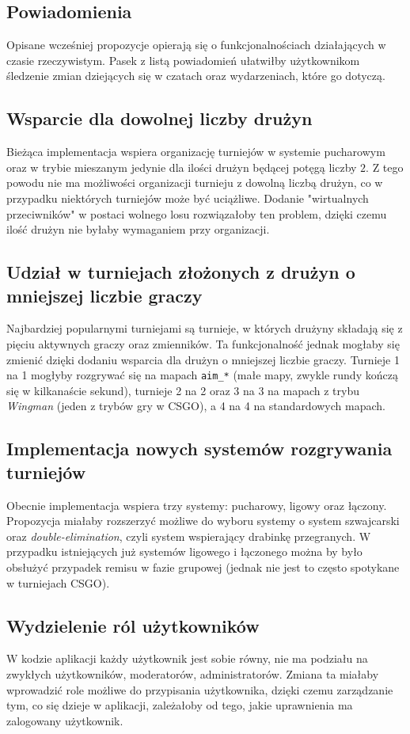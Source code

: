 \documentclass[shortabstract]{iithesis}
\theoremstyle{definition} \newtheorem{definition}{Definicja}[]
\theoremstyle{remark} \newtheorem{remark}[definition]{Observation}
\theoremstyle{plain} \newtheorem{theorem}[definition]{Theorem}
\theoremstyle{plain} \newtheorem{lemma}[definition]{Lemma}
\begin{document}
\subsection{Powiadomienia}
Opisane wcześniej propozycje opierają się o funkcjonalnościach działających w czasie rzeczywistym. Pasek z listą powiadomień ułatwiłby użytkownikom śledzenie zmian dziejących się w czatach oraz wydarzeniach, które go dotyczą.

\subsection{Wsparcie dla dowolnej liczby drużyn}
Bieżąca implementacja wspiera organizację turniejów w systemie pucharowym oraz w trybie mieszanym jedynie dla ilości drużyn będącej potęgą liczby $2$. Z tego powodu nie ma możliwości organizacji turnieju z dowolną liczbą drużyn, co w przypadku niektórych turniejów może być uciążliwe. Dodanie "wirtualnych przeciwników" w postaci wolnego losu rozwiązałoby ten problem, dzięki czemu ilość drużyn nie byłaby wymaganiem przy organizacji.

\subsection{Udział w turniejach złożonych z drużyn o mniejszej liczbie graczy}
Najbardziej popularnymi turniejami są turnieje, w których drużyny składają się z pięciu aktywnych graczy oraz zmienników. Ta funkcjonalność jednak mogłaby się zmienić dzięki dodaniu wsparcia dla drużyn o mniejszej liczbie graczy. Turnieje 1 na 1 mogłyby rozgrywać się na mapach \texttt{aim\_*} (małe mapy, zwykle rundy kończą się w kilkanaście sekund), turnieje 2 na 2 oraz 3 na 3 na mapach z trybu \textit{Wingman} (jeden z trybów gry w CSGO), a 4 na 4 na standardowych mapach.

\subsection{Implementacja nowych systemów rozgrywania turniejów}
Obecnie implementacja wspiera trzy systemy: pucharowy, ligowy oraz łączony. Propozycja miałaby rozszerzyć możliwe do wyboru systemy o system szwajcarski oraz \textit{double-elimination}, czyli system wspierający drabinkę przegranych. W przypadku istniejących już systemów ligowego i łączonego można by było obsłużyć przypadek remisu w fazie grupowej (jednak nie jest to często spotykane w turniejach CSGO).

\subsection{Wydzielenie ról użytkowników}
W kodzie aplikacji każdy użytkownik jest sobie równy, nie ma podziału na zwykłych użytkowników, moderatorów, administratorów. Zmiana ta miałaby wprowadzić role możliwe do przypisania użytkownika, dzięki czemu zarządzanie tym, co się dzieje w aplikacji, zależałoby od tego, jakie uprawnienia ma zalogowany użytkownik.
\end{document}
